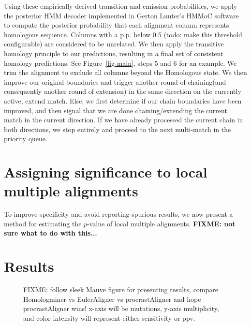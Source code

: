 \documentclass{ws-procs975x65}
\begin{document}
Using these empirically derived transition and emission probabilities, we apply the posterior HMM decoder implemented in Gerton Lunter's HMMoC software~\cite{hmmoc} to compute the posterior probability that each alignment column represents homologous sequence.  Columns with a p.p. below 0.5 (todo: make this threshold configurable) are considered to be unrelated.  We then apply the transitive homology principle to our predictions, resulting in a final set of consistent homology predictions.  See Figure~\ref{fig-main}, steps 5 and 6 for an example. We trim the alignment to exclude all columns beyond the Homologous state. We then improve our original boundaries and trigger another round of chaining(and consequently another round of extension) in the same direction on the currently active, extend match. Else, we first determine if our chain boundaries have been improved, and then signal that we are done chaining/extending the current match in the current direction. If we have already processed the current chain in both directions, we stop entirely and proceed to the next multi-match in the priority queue.

\section{Assigning significance to local multiple alignments}
To improve specificity and avoid reporting spurious results, we now present a method for estimating the $p$-value of local multiple alignments.
\textbf{FIXME: not sure what to do with this...}

\section{Results}
\begin{figure}[t]
\centering {}
\caption{FIXME: follow sleek Mauve figure for presenting results, compare Homologminer vs EulerAligner vs procrastAligner and hope procrastAligner wins! x-axis will be mutations, y-axis multiplicity, and color intensity will represent either sensitivity or ppv.}
\label{fig-hmm}\vspace{-0.2cm}
\end{figure}

%
%
\end{document}
